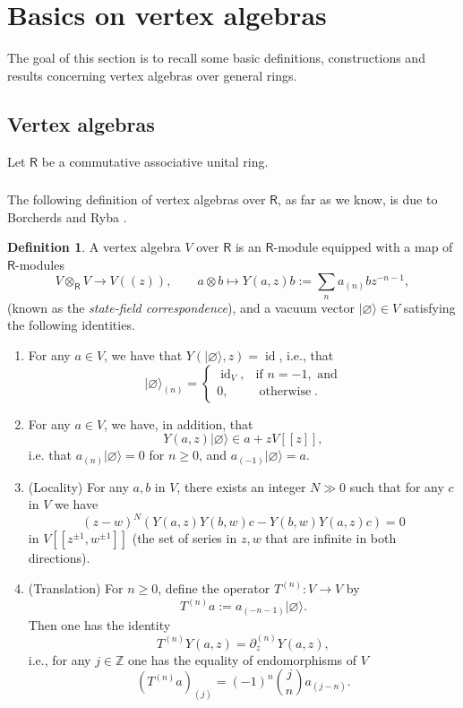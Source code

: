 \documentclass{amsart}
\theoremstyle{definition}
\newtheorem{defi}[Thm]{Definition}
\newcommand{\sss}{\subsubsection{}}
\newcommand{\Ring}{\mathsf{R}}
\numberwithin{equation}{section}
\begin{document}
\fi 




\section{Basics on vertex algebras}\label{S_vertex}
The goal of this section is to recall some basic definitions, constructions and results concerning vertex algebras over general rings.  

\subsection{Vertex algebras}\label{SS_vertex}
Let $\Ring$ be a commutative associative unital ring.

\sss
The following definition of vertex algebras over $\Ring$, as far as we know, is due to Borcherds and Ryba \cite{BR}. 

\begin{defi}\label{defi:vertex_ring} A vertex algebra $V$ over $\Ring$ is an $\Ring$-module equipped with a map of $\Ring$-modules
$$V \otimes_{\Ring} V \rightarrow V(\!(z)\!), \quad \quad a \otimes b \mapsto Y(a,z)b := \sum_n a_{(n)}b z^{-n-1},$$
(known as the {\it state-field correspondence}),
and a vacuum vector
$|\varnothing\rangle\in V$
satisfying the following identities. 


\begin{enumerate}

   \item For any $a \in V$, we have that
$Y(|\varnothing \rangle,z) = \operatorname{id}$, i.e., that $$| \varnothing \rangle_{(n)} = \begin{cases} \operatorname{id}_V, & \text{if } n = -1, \text{ and} \\ 0, & \operatorname{otherwise}.\end{cases}$$

\item For any $a\in V$, we have, in addition, that 
$$Y(a,z) | \varnothing \rangle \in a + z V[[z]],$$
i.e. that $a_{(n)} | \varnothing \rangle = 0$ for $n \geqslant 0$, and $a_{(-1)} | \varnothing \rangle = a$.


\item (Locality) For any $a, b$ in $V$, there exists an integer $N \gg 0$ such that for any $c$ in $V$ we have
$$(z - w)^N \left(Y(a,z)Y(b,w)c- Y(b,w)Y(a,z) c\right)=0$$
in $V[[z^{\pm 1},w^{\pm 1}]]$ (the set of series in $z,w$ that are infinite in both directions).


\item (Translation) For $n \geqslant 0$, define the operator $T^{(n)}:V\rightarrow V$ by
$$T^{(n)} a := a_{(-n-1)} | \varnothing \rangle.$$
Then one has the identity
$$T^{(n)}Y(a,z) = \partial_z^{(n)}Y(a,z),$$
i.e.,  for any $j \in \mathbb{Z}$ one has the equality of endomorphisms of $V$
\begin{equation*}%
(T^{(n)}a)_{(j)}  = (-1)^n {j\choose n} a_{(j-n)}. 
\end{equation*}
\end{enumerate}
\end{defi}
\end{document}
